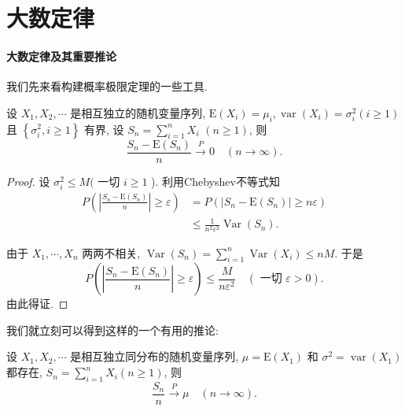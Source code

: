 \section{大数定律}
\paragraph{大数定律及其重要推论}

我们先来看构建概率极限定理的一些工具.

\begin{theorem}[Chebyshev大数律] 
    设 $X_1, X_2, \cdots$ 是相互独立的随机变量序列, $\mathrm{E}\left(X_i\right)=\mu_i, \operatorname{var}\left(X_i\right)=\sigma_i^2(i \geqslant 1)$ 且 $\left\{\sigma_i^2, i \geqslant 1\right\}$ 有界, 设 $S_n=\sum_{i=1}^n X_i$ $(n \geqslant 1)$, 则
$$
\frac{S_n-\mathrm{E}\left(S_n\right)}{n} \stackrel{P}{\longrightarrow} 0 \quad(n \rightarrow \infty) .
$$
\end{theorem}

\begin{proof}
    设 $\sigma_i^2 \leq M($ 一切 $i \geqslant 1$ ). 利用Chebyshev不等式知
$$
\begin{aligned}
P\left(\left|\frac{S_n-\mathrm{E}\left(S_n\right)}{n}\right| \geqslant \varepsilon\right) & =P\left(\left|S_n-\mathrm{E}\left(S_n\right)\right| \geqslant n \varepsilon\right) \\
& \leq \frac{1}{n^2 \varepsilon^2} \operatorname{Var}\left(S_n\right) .
\end{aligned}
$$

由于 $X_1, \cdots, X_n$ 两两不相关, $\operatorname{Var}\left(S_n\right)=\sum_{i=1}^n \operatorname{Var}\left(X_i\right) \leq n M$. 于是
$$
P\left(\left|\frac{S_n-\mathrm{E}\left(S_n\right)}{n}\right| \geqslant \varepsilon\right) \leq \frac{M}{n \varepsilon^2} \quad(\text { 一切 } \varepsilon>0) .
$$
由此得证. 

\end{proof}

我们就立刻可以得到这样的一个有用的推论: 

\begin{corollary}
    设 $X_1, X_2, \cdots$ 是相互独立同分布的随机变量序列, $\mu=\mathrm{E}\left(X_1\right)$ 和 $\sigma^2=\operatorname{var}\left(X_1\right)$ 都存在, $S_n=\sum_{i=1}^n X_i(n \geqslant 1)$, 则
    $$
    \frac{S_n}{n} \stackrel{P}{\longrightarrow} \mu \quad(n \rightarrow \infty) .
    $$
\end{corollary}



